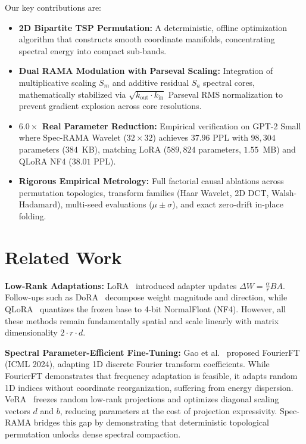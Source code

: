 \documentclass{article}
\begin{document}
Our key contributions are:
\begin{itemize}
    \item \textbf{2D Bipartite TSP Permutation:} A deterministic, offline optimization algorithm that constructs smooth coordinate manifolds, concentrating spectral energy into compact sub-bands.
    \item \textbf{Dual RAMA Modulation with Parseval Scaling:} Integration of multiplicative scaling $S_m$ and additive residual $S_a$ spectral cores, mathematically stabilized via $\sqrt{k_{\text{out}} \cdot k_{\text{in}}}$ Parseval RMS normalization to prevent gradient explosion across core resolutions.
    \item \textbf{$6.0\times$ Real Parameter Reduction:} Empirical verification on GPT-2 Small where Spec-RAMA Wavelet ($32\times 32$) achieves $37.96$ PPL with $98,304$ parameters ($384$~KB), matching LoRA ($589,824$ parameters, $1.55$~MB) and QLoRA NF4 ($38.01$ PPL).
    \item \textbf{Rigorous Empirical Metrology:} Full factorial causal ablations across permutation topologies, transform families (Haar Wavelet, 2D DCT, Walsh-Hadamard), multi-seed evaluations ($\mu \pm \sigma$), and exact zero-drift in-place folding.
\end{itemize}

\section{Related Work}

\textbf{Low-Rank Adaptations:} LoRA~\cite{hu2022lora} introduced adapter updates $\Delta W = \frac{\alpha}{r} B A$. Follow-ups such as DoRA~\cite{liu2024dora} decompose weight magnitude and direction, while QLoRA~\cite{dettmers2023qlora} quantizes the frozen base to 4-bit NormalFloat (NF4). However, all these methods remain fundamentally spatial and scale linearly with matrix dimensionality $2 \cdot r \cdot d$.

\textbf{Spectral Parameter-Efficient Fine-Tuning:} Gao et al.~\cite{gao2024fourierft} proposed FourierFT (ICML 2024), adapting 1D discrete Fourier transform coefficients. While FourierFT demonstrates that frequency adaptation is feasible, it adapts random 1D indices without coordinate reorganization, suffering from energy dispersion. VeRA~\cite{kopiczko2024vera} freezes random low-rank projections and optimizes diagonal scaling vectors $d$ and $b$, reducing parameters at the cost of projection expressivity. Spec-RAMA bridges this gap by demonstrating that deterministic topological permutation unlocks dense spectral compaction.
\end{document}
